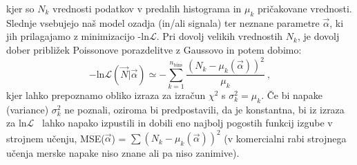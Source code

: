 \documentclass[slovene,11pt,a4paper]{article}
\newcommand{\logl}{\ensuremath{\mathrm{ln}\mathcal{L}\!}}
\begin{document}
kjer so $N_k$ vrednosti podatkov v predalih histograma in $\mu_k$ pričakovane vrednosti. Slednje vsebujejo naš model ozadja (in/ali signala) ter neznane parametre $\vec{\alpha}$, ki jih prilagajamo z minimizacijo -\logl. Pri dovolj velikih vrednostih $N_k$, je dovolj dober približek Poissonove porazdelitve z Gaussovo in potem dobimo:
 \begin{equation}
-\logl(\vec{N}|\vec{\alpha}) \simeq - \sum\limits_{k=1}^{n_\mathrm{bins}} \frac{(N_k-\mu_k(\vec{\alpha}))^2}{\mu_k} ~, 
\end{equation}
kjer lahko prepoznamo obliko izraza za izračun $\chi^2$ s $\sigma_k^2=\mu_k$. Če bi napake (variance) $\sigma^2_k$ ne poznali, oziroma bi predpostavili, da je konstantna, bi iz izraza za \logl~ lahko napako izpustili in dobili eno najbolj pogostih funkcij izgube v strojnem učenju, MSE($\vec{\alpha}$) = $\sum(N_k-\mu_k(\vec{\alpha}))^2$ (v komercialni rabi strojnega učenja merske napake niso znane ali pa niso zanimive). 
\end{document}
